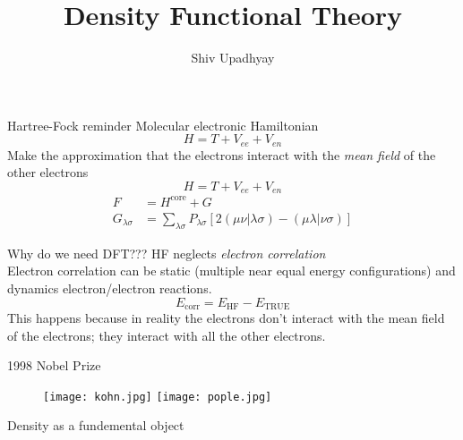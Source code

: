 \documentclass{beamer}
\title{{\Huge Density Functional Theory}}
\author[Shiv]{Shiv Upadhyay}
\institute{\normalsize{\textit{University of Pittsburgh}
\vspace{0.3cm}}}
\begin{document}
\frame{\vspace{-1.25cm}\titlepage}
\begin{frame}[t]{Hartree-Fock reminder}
Molecular electronic Hamiltonian
\begin{equation*}
H = T + V_{ee} + V_{en}
\end{equation*}
\pause
Make the approximation that the electrons interact with the \emph{mean field} of the other electrons\\
\pause
\begin{equation*}
H = T + V_{ee} + V_{en}
\end{equation*}
\pause
\begin{align*}
F &= H^{\mathrm{core}} + G \\
G_{\lambda\sigma} &= \sum_{\lambda\sigma} P_{\lambda\sigma}[2(\mu\nu|\lambda\sigma) - (\mu\lambda|\nu\sigma)]
\end{align*}
\end{frame}
\begin{frame}[t]{Why do we need DFT???}
HF neglects \emph{electron correlation}\\ \vfill
\pause
Electron correlation can be static (multiple near equal energy configurations) and dynamics electron/electron reactions. \\ \vfill
\begin{equation}
E_{\mathrm{corr}} = E_{\mathrm{HF}} - E_{\mathrm{TRUE}}
\end{equation}
\pause
\vfill
This happens because in reality the electrons don't interact with the mean field of the electrons; they interact with all the other electrons.
\vfill
\end{frame}
\begin{frame}[t]{1998 Nobel Prize}
\begin{figure}
\texttt{[image: kohn.jpg]}
\texttt{[image: pople.jpg]}
\end{figure}
\end{frame}
\begin{frame}[t]{Density as a fundemental object}

\end{frame}
\end{document}
